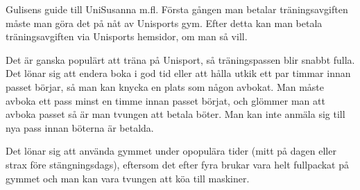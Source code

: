 \documentclass{spektraklet}
\begin{document}
\begin{artikel}{Gulisens guide till Uni}{Susanna m.fl.}
Första gången man betalar träningsavgiften måste man göra det på nåt av Unisports gym. Efter detta kan man betala träningsavgiften via Unisports hemsidor, om man så vill.
 
Det är ganska populärt att träna på Unisport, så träningspassen blir snabbt fulla. Det lönar sig att endera boka i god tid eller att hålla utkik ett par timmar innan passet börjar, så man kan knycka en plats som någon avbokat. Man måste avboka ett pass minst en timme innan passet börjat, och glömmer man att avboka passet så är man tvungen att betala böter. Man kan inte anmäla sig till nya pass innan böterna är betalda. 

Det lönar sig att använda gymmet under opopulära tider (mitt på dagen eller strax före stängningsdags), eftersom det efter fyra brukar vara helt fullpackat på gymmet och man kan vara tvungen att köa till maskiner.

\end{artikel}
\end{document}
